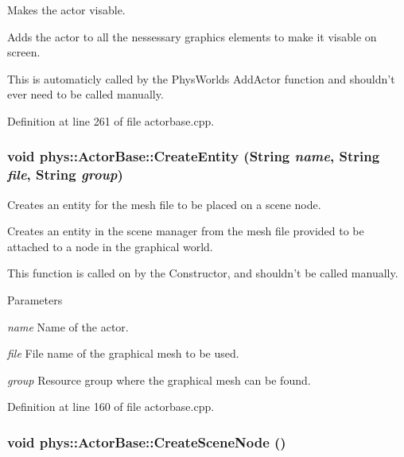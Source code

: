 Makes the actor visable. 

Adds the actor to all the nessessary graphics elements to make it visable on screen. \par
 This is automaticly called by the PhysWorlds AddActor function and shouldn't ever need to be called manually. 

Definition at line 261 of file actorbase.cpp.

\hypertarget{classphys_1_1ActorBase_aff7dbb190fb982a43123bee3066501c4}{
\subsubsection[{CreateEntity}]{\setlength{\rightskip}{0pt plus 5cm}void phys::ActorBase::CreateEntity ({\bf String} {\em name}, \/  {\bf String} {\em file}, \/  {\bf String} {\em group})}}
\label{d8/d0f/classphys_1_1ActorBase_aff7dbb190fb982a43123bee3066501c4}


Creates an entity for the mesh file to be placed on a scene node. 

Creates an entity in the scene manager from the mesh file provided to be attached to a node in the graphical world. \par
 This function is called on by the Constructor, and shouldn't be called manually. 
\begin{DoxyParams}{Parameters}
\item[{\em name}]Name of the actor. \item[{\em file}]File name of the graphical mesh to be used. \item[{\em group}]Resource group where the graphical mesh can be found. \end{DoxyParams}


Definition at line 160 of file actorbase.cpp.

\hypertarget{classphys_1_1ActorBase_a125d6f0a0b4072e64490638c074eea2d}{
\subsubsection[{CreateSceneNode}]{\setlength{\rightskip}{0pt plus 5cm}void phys::ActorBase::CreateSceneNode ()}}
\label{d8/d0f/classphys_1_1ActorBase_a125d6f0a0b4072e64490638c074eea2d}


